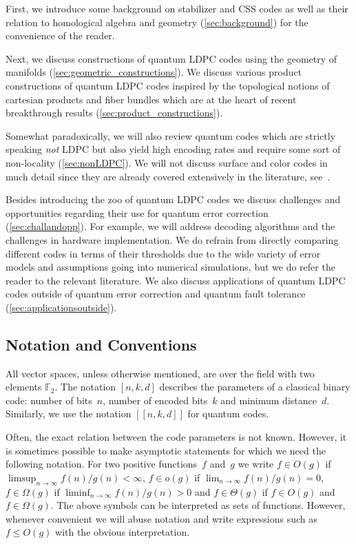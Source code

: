 \documentclass[amsmath, amssymb, floatfix, reprint, twocolumn, notitlepage, 10pt]{revtex4-1}
\newcommand{\change}{}
\begin{document}
First, we introduce some background on stabilizer and CSS codes as well as their relation to homological algebra and geometry (\cref{sec:background}) for the convenience of the reader.

Next, we discuss constructions of quantum LDPC codes using the geometry of manifolds (\cref{sec:geometric_constructions}).
We discuss various product constructions of quantum LDPC codes inspired by the topological notions of cartesian products and fiber bundles which  are at the heart of recent breakthrough results (\cref{sec:product_constructions}).
%

{\change Somewhat paradoxically, we will also review quantum codes which are strictly speaking \emph{not} LDPC but also yield high encoding rates and require some sort of non-locality (\cref{sec:nonLDPC}).
We will not discuss surface and color codes in much detail since they are already covered extensively in the literature, see~\cite{lidar2013quantum,dennis2002topological,kubica2018abcs}.}

Besides introducing the zoo of quantum LDPC codes we discuss challenges and opportunities regarding their use for quantum error correction (\cref{sec:challandopp}).
For example, we will address decoding algorithms and the challenges in hardware implementation.
We do refrain from directly comparing different codes in terms of their thresholds due to the wide variety of error models and assumptions going into numerical simulations, but we do refer the reader to the relevant literature.
We also discuss applications of quantum LDPC codes outside of quantum error correction and quantum fault tolerance (\cref{sec:applicationsoutside}).


\subsection*{Notation and Conventions}
All vector spaces, unless otherwise mentioned, are over the field with two elements $\mathbb{F}_2.$
The notation $[n,k,d]$ describes the parameters of a classical binary code: number of bits~$n$, number of encoded bits~$k$ and minimum distance~$d$.
Similarly, we use the notation $[[n,k,d]]$ for quantum codes.

Often, the exact relation between the code parameters is not known.
However, it is sometimes possible to make asymptotic statements for which we need the following notation.
For two positive functions~$f$ and~$g$ we write $f\in O(g)$ if $\limsup_{n\rightarrow\infty} f(n)/g(n) < \infty$, $f\in o(g)$ if $\lim_{n\rightarrow\infty} f(n)/g(n) = 0$, $f\in \Omega(g)$ if $\liminf_{n\rightarrow\infty} f(n)/g(n) > 0$ and $f\in \Theta(g)$ if $f\in O(g)$ and $f\in \Omega(g)$.
The above symbols can be interpreted as sets of functions. 
However, whenever convenient we will abuse notation and write expressions such as $f \leq O(g)$ with the obvious interpretation.
\end{document}
